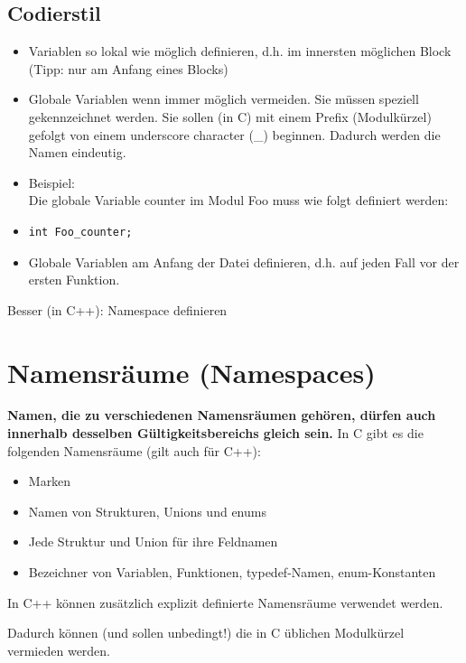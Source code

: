 \subsection{Codierstil}
\begin{itemize}
	\item Variablen so lokal wie möglich definieren, d.h. im innersten möglichen Block (Tipp: nur am Anfang eines Blocks)
	\item Globale Variablen wenn immer möglich vermeiden. Sie müssen speziell gekennzeichnet werden. Sie sollen (in C) mit einem Prefix (Modulkürzel) gefolgt von einem underscore character (\_) beginnen. Dadurch werden die Namen eindeutig.
	\item[\-] Beispiel:\\Die globale Variable counter im Modul Foo muss wie folgt definiert werden:
	\item[\-]
\vspace{-\baselineskip}
\begin{minipage}{0.25\linewidth}
\begin{lstlisting}
int Foo_counter;
\end{lstlisting}
\end{minipage}
	\item Globale Variablen am Anfang der Datei definieren, d.h. auf jeden Fall vor der ersten Funktion.
\end{itemize}
\begin{hinweis}
Besser (in C++): Namespace definieren
\end{hinweis}

\section{Namensräume (Namespaces)}
\textbf{Namen, die zu verschiedenen Namensräumen gehören, dürfen auch innerhalb desselben Gültigkeitsbereichs gleich sein.}
In C gibt es die folgenden Namensräume (gilt auch für C++):
\begin{itemize}
	\item Marken
	\item Namen von Strukturen, Unions und enums
	\item Jede Struktur und Union für ihre Feldnamen
	\item Bezeichner von Variablen, Funktionen, typedef-Namen, enum-Konstanten
\end{itemize}
In C++ können zusätzlich explizit definierte Namensräume verwendet werden.\\
\begin{hinweis}
Dadurch können (und sollen unbedingt!) die in C üblichen Modulkürzel vermieden werden.
\end{hinweis}
\vspace{-\baselineskip}

